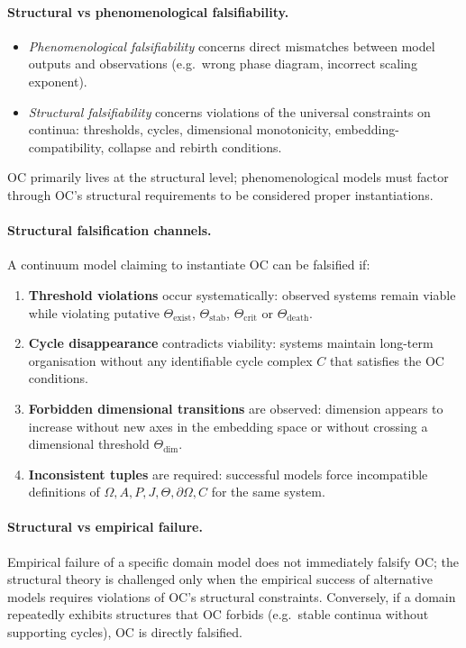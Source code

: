 \paragraph{Structural vs phenomenological falsifiability.}
\begin{itemize}
  \item \emph{Phenomenological falsifiability} concerns direct mismatches
        between model outputs and observations (e.g.\ wrong phase diagram,
        incorrect scaling exponent).
  \item \emph{Structural falsifiability} concerns violations of the universal
        constraints on continua: thresholds, cycles, dimensional monotonicity,
        embedding-compatibility, collapse and rebirth conditions.
\end{itemize}
OC primarily lives at the structural level; phenomenological models must
factor through OC’s structural requirements to be considered proper
instantiations.

\paragraph{Structural falsification channels.}
A continuum model claiming to instantiate OC can be falsified if:
\begin{enumerate}
  \item \textbf{Threshold violations} occur systematically:
        observed systems remain viable while violating putative
        \(\Theta_{\mathrm{exist}}\), \(\Theta_{\mathrm{stab}}\),
        \(\Theta_{\mathrm{crit}}\) or \(\Theta_{\mathrm{death}}\).
  \item \textbf{Cycle disappearance} contradicts viability:
        systems maintain long-term organisation without any identifiable
        cycle complex \(C\) that satisfies the OC conditions.
  \item \textbf{Forbidden dimensional transitions} are observed:
        dimension appears to increase without new axes in the embedding
        space or without crossing a dimensional threshold
        \(\Theta_{\mathrm{dim}}\).
  \item \textbf{Inconsistent tuples} are required:
        successful models force incompatible definitions of
        \(\Omega, A, P, J, \Theta, \partial\Omega, C\) for the same system.
\end{enumerate}

\paragraph{Structural vs empirical failure.}
Empirical failure of a specific domain model does not immediately falsify OC;
the structural theory is challenged only when the empirical success of
alternative models requires violations of OC’s structural constraints.
Conversely, if a domain repeatedly exhibits structures that OC forbids
(e.g.\ stable continua without supporting cycles), OC is directly falsified.

